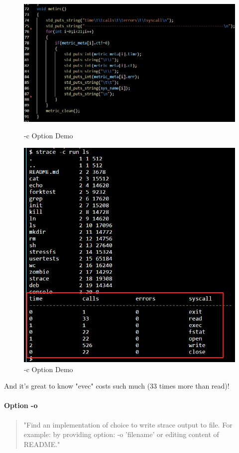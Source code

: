 \documentclass[11pt,oneside,a4paper]{article}
\begin{document}
\begin{figure}[H]
    \includegraphics[width=4.75in]{1-31.png}
    \centering
    \caption{-c Option Demo}
    \includegraphics[width=4.75in]{1-32.png}
    \centering
    \caption{-c Option Demo}
\end{figure}
And it's great to know "evec" costs such much (33 times more than read)!

\paragraph*{Option -o}
\begin{quotation}
    "Find an implementation of choice to write strace output to file.
    For example: by providing option: -o 'filename' or editing content of README."
\end{quotation}
\end{document}
